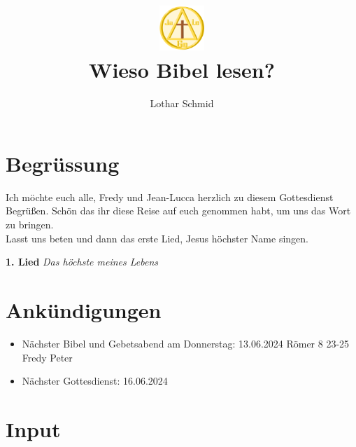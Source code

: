 \documentclass[12pt,a4paper]{scrarticle}
\title{\includegraphics[height=48pt]{assets/images/logo.png}\\Wieso Bibel lesen?}
\author{Lothar Schmid}
\begin{document}
\maketitle

\section{Begrüssung}
Ich möchte euch alle, Fredy und Jean-Lucca herzlich zu diesem Gottesdienst Begrüßen. Schön das ihr diese Reise auf euch genommen habt, um uns das Wort zu bringen. \\Lasst uns beten und dann das erste Lied, Jesus höchster Name singen.

\textbf{1. Lied}
\textit{Das höchste meines Lebens}

\section{Ankündigungen}
\begin{itemize}
    \item Nächster Bibel und Gebetsabend am Donnerstag: 
13.06.2024 Römer 8 23-25 Fredy Peter
    \item Nächster Gottesdienst: 16.06.2024 
\end{itemize}

\section{ Input }
\end{document}
